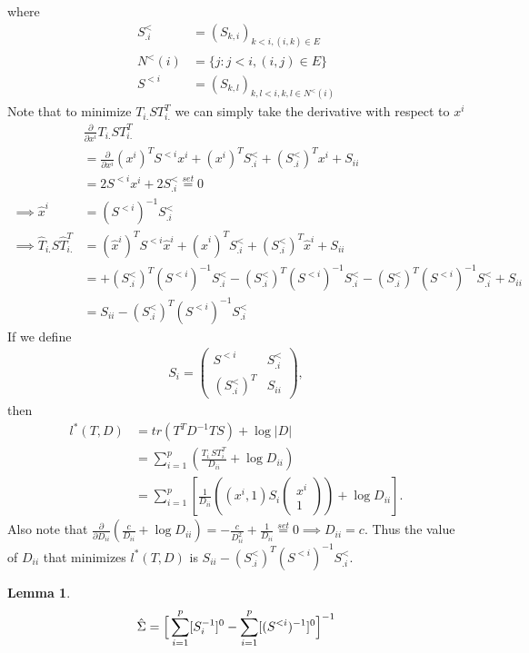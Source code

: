 \documentclass[12pt, leqno]{article}
\providecommand{\abs}[1]{\lvert#1\rvert}
\let\oldhat\hat
\renewcommand{\hat}[1]{\oldhat{{#1}}}
\def\s{\ensuremath\Sigma}
\newtheorem{lemma}{Lemma}[]
\begin{document}
where 
\begin{align*}
S^{<}_{.i} &= (S_{k,i})_{k<i,(i,k) \in E} \\
N^<(i) &= \{j:j<i,(i,j) \in E\}\\
S^{<i} &= (S_{k,l})_{k,l<i, k,l \in N^<(i)} 
\end{align*}
Note that to minimize $T_{i.}ST_{i.}^T$ we can simply take the
derivative with respect to $x^i$
\begin{align*}
&\frac{\partial}{\partial x^i} T_{i.}ST_{i.}^T\\ 
&= \frac{\partial}{\partial x^i} (x^i)^T S^{<i} x^i + (x^i)^T
  S^{<}_{.i} + (S^{<}_{.i})^T x^i + S_{ii} \\
&= 2  S^{<i} x^i + 2S^{<}_{.i} \overset{set}{=} 0 \\
\implies \hat{x}^i &= (S^{<i})^{-1}S^{<}_{.i} \\
\implies \hat{T}_{i.}S \hat{T}_{i.}^T &= (\hat{x}^i)^T S^{<i} \hat{x}^i +
                           (\hat{x}^i)^T S^{<}_{.i} + (S^{<}_{.i})^T
                           \hat{x}^i + S_{ii} \\
&= + (S^{<}_{.i})^T (S^{<i})^{-1}S^{<}_{.i} -  (S^{<}_{.i})^T
  (S^{<i})^{-1} S^{<}_{.i} -  (S^{<}_{.i})^T
  (S^{<i})^{-1} S^{<}_{.i} + S_{ii} \\
&= S_{ii} -  (S^{<}_{.i})^T
  (S^{<i})^{-1} S^{<}_{.i}
\end{align*}
If we define
\begin{align*}
S_i = \begin{pmatrix} 
S^{<i} & S^{<}_{.i} \\
(S^{<}_{.i})^T& S_{ii} 
\end{pmatrix},
\end{align*}
then 
\begin{align*}
l^*(T,D) &= tr(T^{T}D^{-1}TS) + \log \abs{D} \\ 
&= \sum_{i=1}^p (\frac{T_{i.}S T_{i.}^T}{D_{ii}}+ \log
  D_{ii}) \\
&= \sum_{i=1}^p [\frac{1}{D_{ii}}((x^i,1)
S_i
\begin{pmatrix} 
x^i\\1
\end{pmatrix})+ \log
  D_{ii}].
\end{align*}
Also note that $\frac{\partial}{\partial
  D_{ii}}(\frac{c}{D_{ii}}+\log{D_{ii}}) = -\frac{c}{D_{ii}^2} +
\frac{1}{D_{ii}} \overset{set}{=} 0 \implies D_{ii} = c$. Thus the
value of $D_{ii}$ that minimizes $l^*(T,D)$ is $S_{ii} -  (S^{<}_{.i})^T
  (S^{<i})^{-1} S^{<}_{.i}$.
\begin{lemma}
\begin{align*}
\hat{\s} = \Big[\sum_{i=1}^p[S_i^{-1}]^0-\sum_{i=1}^p[(S^{<i} )^{-1}]^0 \Big]^{-1}
\end{align*}
\end{lemma}
\end{document}
